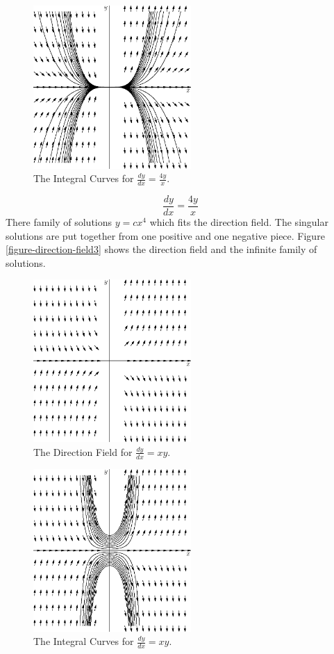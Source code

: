 \documentclass[fleqn,letterpaper]{report}
\begin{document}
\begin{figure}[t]
\centering
\includegraphics[width=6cm]{figure11.eps}
\caption{The Integral Curves for $\frac{dy}{dx} = \frac{4y}{x}$.}
\label{figure-direction-field3-curves}
\end{figure}

\begin{example}
\begin{equation*}
\frac{dy}{dx} = \frac{4y}{x}
\end{equation*}
There family of solutions $y = cx^4$ which fits the direction
field. The singular solutions are put together from one positive and
one negative piece. Figure \ref{figure-direction-field3} shows
the direction field and the infinite family of solutions.  
\end{example}

\begin{figure}[t]
\centering
\includegraphics[width=6cm]{figure12.eps}
\caption{The Direction Field for $\frac{dy}{dx} = xy$.}
\label{figure-direction-field4}
\end{figure}

\begin{figure}[t]
\centering
\includegraphics[width=6cm]{figure13.eps}
\caption{The Integral Curves for $\frac{dy}{dx} = xy$.}
\label{figure-direction-field4-curves}
\end{figure}
\end{document}
